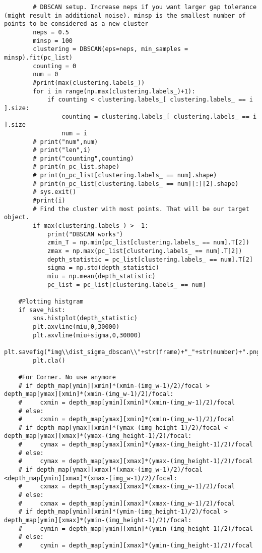 \begin{lstlisting}
        # DBSCAN setup. Increase neps if you want larger gap tolerance (might result in additional noise). minsp is the smallest number of points to be considered as a new cluster
        neps = 0.5
        minsp = 100
        clustering = DBSCAN(eps=neps, min_samples = minsp).fit(pc_list)
        counting = 0
        num = 0
        #print(max(clustering.labels_))
        for i in range(np.max(clustering.labels_)+1):
            if counting < clustering.labels_[ clustering.labels_ == i ].size:
                counting = clustering.labels_[ clustering.labels_ == i ].size
                num = i
        # print("num",num)
        # print("len",i)
        # print("counting",counting)
        # print(n_pc_list.shape)
        # print(n_pc_list[clustering.labels_ == num].shape)
        # print(n_pc_list[clustering.labels_ == num][:][2].shape)
        # sys.exit()
        #print(i)
        # Find the cluster with most points. That will be our target object.
        if max(clustering.labels_) > -1:
            print("DBSCAN works")
            zmin_T = np.min(pc_list[clustering.labels_ == num].T[2])
            zmax = np.max(pc_list[clustering.labels_ == num].T[2])
            depth_statistic = pc_list[clustering.labels_ == num].T[2]
            sigma = np.std(depth_statistic)
            miu = np.mean(depth_statistic)
            pc_list = pc_list[clustering.labels_ == num]

    #Plotting histgram
    if save_hist:
        sns.histplot(depth_statistic)
        plt.axvline(miu,0,30000)
        plt.axvline(miu+sigma,0,30000)
        plt.savefig("img\\dist_sigma_dbscan\\"+str(frame)+"_"+str(number)+".png")
        plt.cla()

    #For Corner. No use anymore
    # if depth_map[ymin][xmin]*(xmin-(img_w-1)/2)/focal > depth_map[ymax][xmin]*(xmin-(img_w-1)/2)/focal:
    #     cxmin = depth_map[ymin][xmin]*(xmin-(img_w-1)/2)/focal
    # else:
    #     cxmin = depth_map[ymax][xmin]*(xmin-(img_w-1)/2)/focal
    # if depth_map[ymax][xmin]*(ymax-(img_height-1)/2)/focal < depth_map[ymax][xmax]*(ymax-(img_height-1)/2)/focal:
    #     cymax = depth_map[ymax][xmin]*(ymax-(img_height-1)/2)/focal
    # else:
    #     cymax = depth_map[ymax][xmax]*(ymax-(img_height-1)/2)/focal
    # if depth_map[ymax][xmax]*(xmax-(img_w-1)/2)/focal <depth_map[ymin][xmax]*(xmax-(img_w-1)/2)/focal:
    #     cxmax = depth_map[ymax][xmax]*(xmax-(img_w-1)/2)/focal
    # else:
    #     cxmax = depth_map[ymin][xmax]*(xmax-(img_w-1)/2)/focal
    # if depth_map[ymin][xmin]*(ymin-(img_height-1)/2)/focal > depth_map[ymin][xmax]*(ymin-(img_height-1)/2)/focal:
    #     cymin = depth_map[ymin][xmin]*(ymin-(img_height-1)/2)/focal
    # else:
    #     cymin = depth_map[ymin][xmax]*(ymin-(img_height-1)/2)/focal



\end{lstlisting}
